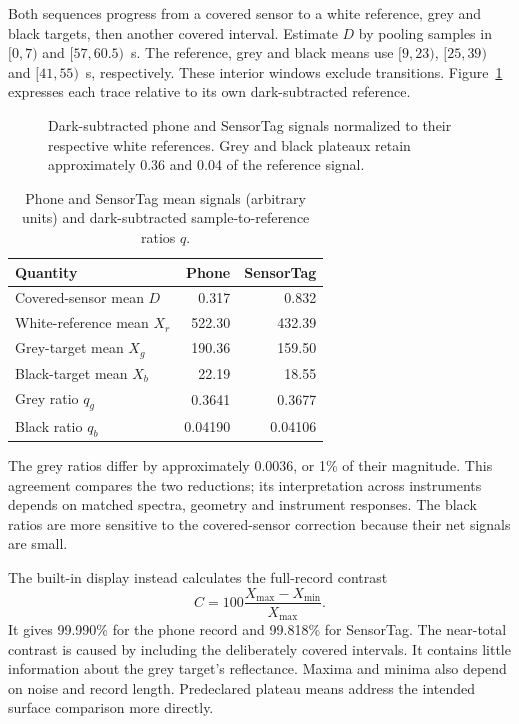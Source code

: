 Both sequences progress from a covered sensor to a white reference, grey and black targets, then another covered interval. Estimate $D$ by pooling samples in $[0,7)$ and $[57,60.5)$~s. The reference, grey and black means use $[9,23)$, $[25,39)$ and $[41,55)$~s, respectively. These interior windows exclude transitions. Figure~\ref{fig:albedo-example} expresses each trace relative to its own dark-subtracted reference.

\begin{figure}[!htbp]
\centering

\caption{Dark-subtracted phone and SensorTag signals normalized to their respective white references. Grey and black plateaux retain approximately 0.36 and 0.04 of the reference signal.}
\label{fig:albedo-example}
\end{figure}

\begin{table}[!htbp]
\caption{Phone and SensorTag mean signals (arbitrary units) and dark-subtracted sample-to-reference ratios $q$.}
\label{tab:alb-example}
\centering\small
\begin{tabular}{@{}lrr@{}}
\toprule
Quantity & Phone & SensorTag\\
\midrule
Covered-sensor mean $D$ & 0.317 & 0.832\\
White-reference mean $X_r$ & 522.30 & 432.39\\
Grey-target mean $X_g$ & 190.36 & 159.50\\
Black-target mean $X_b$ & 22.19 & 18.55\\
Grey ratio $q_g$ & 0.3641 & 0.3677\\
Black ratio $q_b$ & 0.04190 & 0.04106\\
\bottomrule
\end{tabular}
\end{table}

The grey ratios differ by approximately 0.0036, or 1\% of their magnitude. This agreement compares the two reductions; its interpretation across instruments depends on matched spectra, geometry and instrument responses. The black ratios are more sensitive to the covered-sensor correction because their net signals are small.

The built-in display instead calculates the full-record contrast
\begin{equation}
 C=100\frac{X_{\max}-X_{\min}}{X_{\max}}.
 \label{eq:alb-contrast}
\end{equation}
It gives 99.990\% for the phone record and 99.818\% for SensorTag. The near-total contrast is caused by including the deliberately covered intervals. It contains little information about the grey target's reflectance. Maxima and minima also depend on noise and record length. Predeclared plateau means address the intended surface comparison more directly.

